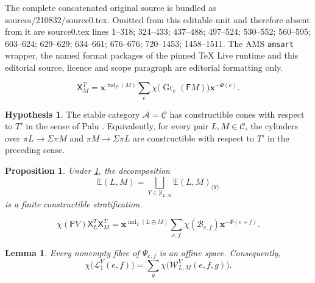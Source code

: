 \documentclass[10pt,a4paper]{amsart}
\numberwithin{equation}{section}
\newtheorem{proposition}[theorem]{Proposition}
\newtheorem{lemma}[theorem]{Lemma}
\theoremstyle{definition}
\newtheorem{Hypothesis}[theorem]{Hypothesis}
\DeclareMathOperator{\Gr}{Gr}
\DeclareMathOperator{\ind}{ind}
\newcommand{\C}{\mathcal C}
\newcommand{\A}{\mathcal A}
\newcommand{\E}{\mathbb E}
\newcommand{\F}{\mathsf F}
\newcommand{\X}{\mathsf X}
\newcommand{\bx}{\mathbf x}
\begin{document}
The complete concatenated original source is bundled as sources/210832/source0.tex. Omitted from this editable unit and therefore absent from it are source0.tex lines 1--318; 324--433; 437--488; 497--524; 530--552; 560--595; 603--624; 629--629; 634--661; 676--676; 720--1453; 1458--1511. The AMS \texttt{amsart} wrapper, the named format packages of the pinned TeX Live runtime and this editorial source, licence and scope paragraph are editorial formatting only.\par\smallskip
\setcounter{section}{2}
\setcounter{equation}{2}
\setcounter{theorem}{1}
\begin{equation}\label{eq:character}
 \X^T_M
 =\bx^{\ind_T(M)}
   \sum_e\chi\bigl(\Gr_e(\F M)\bigr)\bx^{-\Phi(e)}.
\end{equation}

\setcounter{section}{3}
\setcounter{equation}{3}
\setcounter{theorem}{0}
\begin{Hypothesis}\label{hyp:constructible-cones}
The stable category $\A=\underline{\C}$ has constructible cones with respect to $T'$ in the sense of Palu \cite[Section~1.3]{Palu2012}. Equivalently, for every pair $L,M\in\C$, the cylinders over $\pi L\to\Sigma\pi M$ and $\pi M\to\Sigma\pi L$ are constructible with respect to $T'$ in the preceding sense.
\end{Hypothesis}

\setcounter{section}{3}
\setcounter{equation}{4}
\setcounter{theorem}{3}
\begin{proposition}\label{prop:stratification}
Under \cref{hyp:constructible-cones}, the decomposition
\[
 \E(L,M)=\bigsqcup_{Y\in\mathcal Y_{L,M}}
 \E(L,M)_{\langle Y\rangle}
\]
is a finite constructible stratification.
\end{proposition}

\setcounter{section}{3}
\setcounter{equation}{4}
\setcounter{theorem}{5}
\begin{equation}\label{eq:lhs-expansion}
 \chi(\mathbb PV)\X^T_L\X^T_M
 =\bx^{\ind_T(L\oplus M)}
   \sum_{e,f}\chi(\mathcal B_{e,f})\bx^{-\Phi(e+f)}.
\end{equation}

\setcounter{section}{3}
\setcounter{equation}{5}
\setcounter{theorem}{5}
\begin{lemma}\label{lem:forward-fibres}
Every nonempty fibre of $\Psi_{e,f}$ is an affine space.  Consequently,
\[
 \chi\bigl(\mathcal L^V_1(e,f)\bigr)
 =\sum_g\chi\bigl(\mathcal W^V_{L,M}(e,f,g)\bigr).
\]
\end{lemma}
\end{document}
